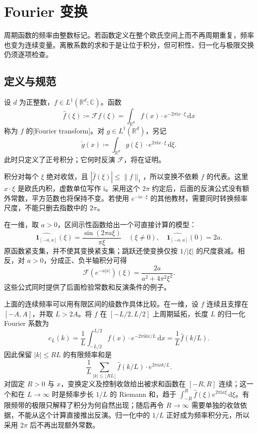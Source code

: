\section{Fourier 变换}
\label{b2:sec:0301}

周期函数的频率由整数标记。若函数定义在整个欧氏空间上而不再周期重复，频率也变为连续变量。离散系数的求和于是让位于积分，但可积性、归一化与极限交换仍须逐项检查。

\subsection{定义与规范}
\label{b2:subsec:030101}

\begin{definition}\label{b2:def:03-fourier-transform}
设 \(d\) 为正整数，\(f\in L^1(\mathbb R^d;\mathbb C)\)。函数
\begin{equation}\label{b2:eq:03-fourier-definition}
 \widehat f(\xi)\coloneqq\mathcal Ff(\xi)
 =\int_{\mathbb R^d}f(x)\cdot e^{-2\pi\mathrm{i}x\cdot\xi}\,\mathrm{d}x
\end{equation}
称为 \(f\) 的[Fourier transform]。对 \(g\in L^1(\mathbb R^d)\)，另记
\[
 \check g(x)\coloneqq\int_{\mathbb R^d}g(\xi)\cdot e^{2\pi\mathrm{i}x\cdot\xi}\,\mathrm{d}\xi.
\]
此时只定义了正号积分；它何时反演 \(\mathcal F\)，将在证明。
\end{definition}

积分对每个 \(\xi\) 绝对收敛，且 \(|\widehat f(\xi)|\leq\|f\|_1\)，所以变换不依赖 \(f\) 的代表。这里 \(x\cdot\xi\) 是欧氏内积，虚数单位写作 \(\mathrm{i}\)。采用这个 \(2\pi\) 约定后，后面的反演公式没有额外常数，平方范数也将保持不变。若使用 \(e^{-\mathrm{i}x\cdot\xi}\) 的其他教材，需要同时转换频率尺度，不能只删去指数中的 \(2\pi\)。

\ProseParagraphBreak

在一维，取 \(a>0\)，区间示性函数给出一个可直接计算的模型：
\[
 \widehat{\mathbf1_{[-a,a]}}(\xi)=\dfrac{\sin(2\pi a\xi)}{\pi\xi}\quad(\xi\ne0),
 \quad \widehat{\mathbf1_{[-a,a]}}(0)=2a.
\]
原函数紧支集，并不使其变换紧支集；跳跃还使变换仅按 \(1/|\xi|\) 的尺度衰减。相反，对 \(a>0\)，分成正、负半轴积分可得
\[
 \mathcal F(e^{-a|x|})(\xi)=\dfrac{2a}{a^2+4\pi^2\xi^2}.
\]
这些公式同时提供了后面检验常数和反演条件的例子。

上面的连续频率可以用有限区间的级数作具体比较。在一维，设 \(f\) 连续且支撑在 \([-A,A]\)，并取 \(L>2A\)。将 \(f\) 在 \([-L/2,L/2]\) 上周期延拓，长度 \(L\) 的归一化 Fourier 系数为
\[
 c_L(k)=\frac1L\int_{-L/2}^{L/2}f(x)\cdot e^{-2\pi\mathrm i kx/L}\,\mathrm dx
       =\frac1L\widehat f(k/L).
\]
因此保留 \(|k|\leq RL\) 的有限频率和是
\[
 \frac1L\sum_{|k|\leq\lfloor RL\rfloor}
 \widehat f(k/L)\cdot e^{2\pi\mathrm i xk/L}.
\]
对固定 \(R>0\) 与 \(x\)，变换定义及控制收敛给出被求和函数在 \([-R,R]\) 连续；这一个和在 \(L\to\infty\) 时是频率步长 \(1/L\) 的 Riemann 和，趋于 \(\int_{-R}^R\widehat f(\xi)e^{2\pi\mathrm i x\xi}\,\mathrm d\xi\)。有限频带的极限只解释了积分为何自然出现；随后再令 \(R\to\infty\) 需要单独的收敛依据，不能从这个计算直接推出反演。归一化中的 \(1/L\) 正好成为频率积分元，所以采用 \(2\pi\) 后不再出现额外常数。

